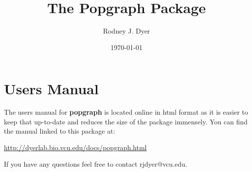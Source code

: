 \documentclass{article}
\title{The Popgraph Package}
\author{Rodney J. Dyer}
\date{\today}
\begin{document}
\maketitle

\section*{Users Manual}

The users manual for {\bfseries popgraph} is located online in html format as it is easier to keep that up-to-date and reduces the size of the package immensely.  You can find the manual linked to this package at:\\[1em]

\begin{center}
\url{http://dyerlab.bio.vcu.edu/docs/popgraph.html}\\[1em]
\end{center}

If you have any questions feel free to contact rjdyer@vcu.edu.
\end{document}
